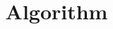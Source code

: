 \documentclass[12pt,twiside,a4paper]{ctexbook}
\numberwithin{chapter}{part}
\begin{document}

\author
{
}


\title{Algorithm}
\maketitle
\tableofcontents %
\newpage
\pagestyle{fancy}
\end{document}
